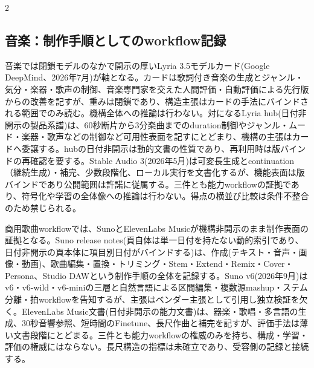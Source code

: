 \documentclass[lualatex,a4paper,10pt]{jlreq}
\begin{document}
\begin{multicols}{2}
\subsection{音楽：制作手順としてのworkflow記録}
音楽では閉鎖モデルのなかで開示の厚いLyria 3.5モデルカード(Google DeepMind、2026年7月)が軸となる\autocite{btd111}。カードは歌詞付き音楽の生成とジャンル・気分・楽器・歌声の制御、音楽専門家を交えた人間評価・自動評価による先行版からの改善を記すが、重みは閉鎖であり、構造主張はカードの手法にバインドされる範囲でのみ読む。機構全体への推論は行わない。対になるLyria hub(日付非開示の製品系譜)は、60秒断片から3分楽曲までのduration制御やジャンル・ムード・楽器・歌声などの制御など可用性表面を記すにとどまり、機構の主張はカードへ委譲する\autocite{btd112}。hubの日付非開示は動的文書の性質であり、再利用時は版バインドの再確認を要する。Stable Audio 3(2026年5月)は可変長生成とcontinuation（継続生成）・補完、少数段階化、ローカル実行を文書化するが、機能表面は版バインドであり公開範囲は許諾に従属する\autocite{btd113}。三件とも能力workflowの証拠であり、符号化や学習の全体像への推論は行わない。得点の横並び比較は条件不整合のため禁じられる。

商用歌曲workflowでは、SunoとElevenLabs Musicが機構非開示のまま制作表面の証拠となる。Suno release notes(頁自体は単一日付を持たない動的索引であり、日付非開示の頁本体に項目別日付がバインドする)は、作成(テキスト・音声・画像・動画)、歌曲編集・置換・トリミング・Stem・Extend・Remix・Cover・Persona、Studio DAWという制作手順の全体を記録する\autocite{btd114}。Suno v6(2026年9月)はv6・v6-wild・v6-miniの三層と自然言語による区間編集・複数源mashup・ステム分離・拍workflowを告知するが、主張はベンダー主張として引用し独立検証を欠く\autocite{btd115}。ElevenLabs Music文書(日付非開示の能力文書)は、器楽・歌唱・多言語の生成、30秒音響参照、短時間のFinetune、長尺作曲と補完を記すが、評価手法は薄い文書段階にとどまる\autocite{btd116}。三件とも能力workflowの権威のみを持ち、構成・学習・評価の権威にはならない。長尺構造の指標は未確立であり、受容側の記録と接続する。


\end{multicols}
\end{document}
